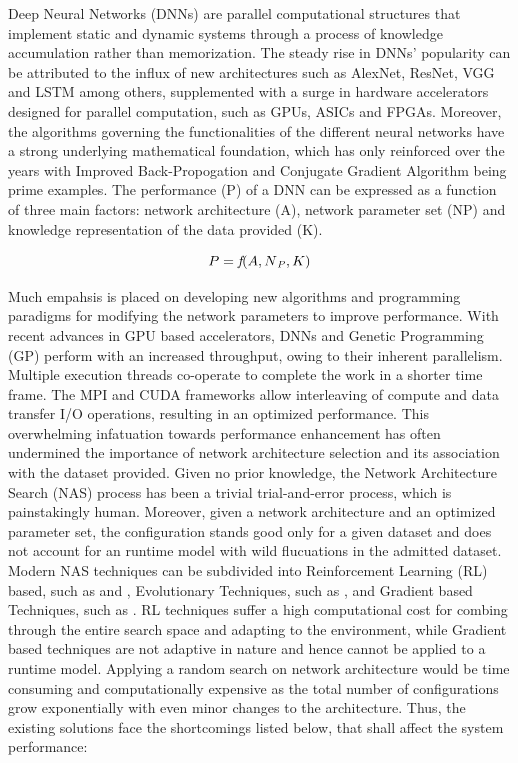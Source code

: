 \documentclass[conference]{IEEEtran}
\begin{document}
Deep Neural Networks (DNNs) are parallel computational structures that implement static and dynamic systems through a process of knowledge accumulation rather than memorization. The steady rise in DNNs' popularity can be attributed to the influx of new architectures such as AlexNet\cite{AlexNet}, ResNet\cite{ResNet}, VGG\cite{VGG} and LSTM\cite{LSTM} among others, supplemented with a surge in hardware accelerators designed for parallel computation, such as GPUs, ASICs and FPGAs. Moreover, the algorithms governing the functionalities of the different neural networks have a strong underlying mathematical foundation, which has only reinforced over the years with Improved Back-Propogation \cite{IBP} and Conjugate Gradient Algorithm \cite{CGA} being prime examples. The performance (P) of a DNN can be expressed as a function of three main factors: network architecture (A), network parameter set (NP) and knowledge representation of the data provided (K).

\begin{equation}
P = \textit{f}(A, N\textsubscript{\textit{P}}, K) \label{performance}
\end{equation}

Much empahsis is placed on developing new algorithms and programming paradigms for modifying the network parameters to improve performance. With recent advances in GPU based accelerators, DNNs and Genetic Programming (GP) perform with an increased throughput, owing to their inherent parallelism. Multiple execution threads co-operate to complete the work in a shorter time frame. The MPI and CUDA frameworks allow interleaving of compute and data transfer I/O operations, resulting in an optimized performance. This overwhelming infatuation towards performance enhancement has often undermined the importance of network architecture selection and its association with the dataset provided. Given no prior knowledge, the Network Architecture Search (NAS) process has been a trivial trial-and-error process, which is painstakingly human. Moreover, given a network architecture and an optimized parameter set, the configuration stands good only for a given dataset and does not account for an runtime model with wild flucuations in the admitted dataset. Modern NAS techniques can be subdivided into Reinforcement Learning (RL) based, such as \cite{RLNAS1} and \cite{RLNAS2}, Evolutionary Techniques, such as \cite{ENAS}, and Gradient based Techniques, such as \cite{GNAS}. RL techniques suffer a high computational cost for combing through the entire search space and adapting to the environment, while Gradient based techniques are not adaptive in nature and hence cannot be applied to a runtime model. Applying a random search on network architecture would be time consuming and computationally expensive as the total number of configurations grow exponentially with even minor changes to the architecture. Thus, the existing solutions face the shortcomings listed below, that shall affect the system performance:
\end{document}
